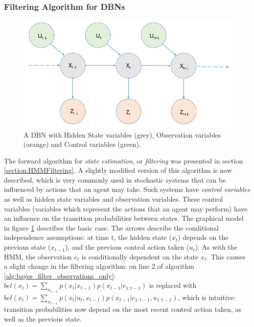 \subsubsection{Filtering Algorithm for DBNs}\label{subsubsec:filteringDBN}
\begin{figure}
    \centering
    \includegraphics[width = 0.65\linewidth]{Chapters/MultiAgentTargetDetection/BayesianFiltering/Figs/HMMs/HMMWithControl.png}
    \caption{A DBN with Hidden State variables (grey), Observation variables (orange) and Control variables (green).}
    \label{fig:HMMWithControlVariablesExample}
\end{figure}
The forward algorithm for \textit{state estimation}, or \textit{filtering} was presented in section \ref{section:HMMFiltering}. A slightly modified version of this algorithm is now described, which is very commonly used in stochastic systems that can be influenced by actions that an agent may take. Such systems have \textit{control variables} as well as hidden state variables and observation variables. These control variables (variables which represent the actions that an agent may perform) have an influence on the transition probabilities between states. The graphical model in figure \ref{fig:HMMWithControlVariablesExample} describes the basic case. The arrows describe the conditional independence assumptions: at time t, the hidden state ($x_t$) depends on the previous state ($x_{t-1}$), and the previous control action taken ($u_t$). As with the HMM, the observation $e_t$ is conditionally dependent on the state $x_t$. This causes a slight change in the filtering algorithm: on line 2 of algorithm \ref{alg:bayes_filter_observations_only}: $\overline{bel}(x_t) = \sum_{x_{t-1}} p(x_t | x_{t-1}) p(x_{t-1} | e_{1:t-1}) $ is replaced with $\overline{bel}(x_t) = \sum_{x_{t-1}} p(x_t | u_t, x_{t-1}) p(x_{t-1} | e_{1:t-1}, u_{1:t-1}) $, which is intuitive: transition probabilities now depend on the most recent control action taken, as well as the previous state.


